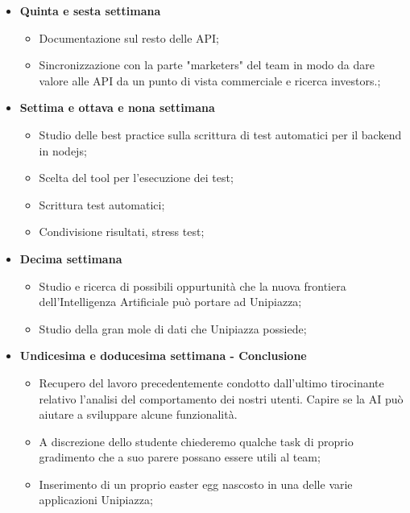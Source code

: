 {\begin{itemize}
\begin{itemize}
        \end{itemize}
        \item \textbf{Quinta e sesta settimana} 
        \begin{itemize}
            \item Documentazione sul resto delle API;
            \item Sincronizzazione con la parte "marketers" del team in modo da dare valore alle API da un punto di vista commerciale e ricerca investors.;
        \end{itemize}
        \item \textbf{Settima e ottava e nona settimana} 
        \begin{itemize}
            \item Studio delle best practice sulla scrittura di test automatici per il backend in nodejs;
            \item Scelta del tool per l'esecuzione dei test;
            \item Scrittura test automatici;
            \item Condivisione risultati, stress test;
        \end{itemize}
        \item \textbf{Decima settimana} 
        \begin{itemize}
            \item Studio e ricerca di possibili oppurtunità che la nuova frontiera dell'Intelligenza Artificiale può portare ad Unipiazza;
            \item Studio della gran mole di dati che Unipiazza possiede;
        \end{itemize}
        \item \textbf{Undicesima e doducesima settimana - Conclusione} 
        \begin{itemize}
            \item Recupero del lavoro precedentemente condotto dall'ultimo tirocinante relativo l'analisi del comportamento dei nostri utenti. Capire se la AI può aiutare a sviluppare alcune funzionalità.
            \item A discrezione dello studente chiederemo qualche task di proprio gradimento che a suo parere possano essere utili al team;
            \item Inserimento di un proprio easter egg nascosto in una delle varie applicazioni Unipiazza;
        \end{itemize}
    \end{itemize}
}

